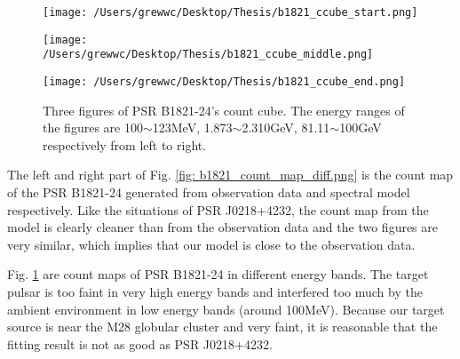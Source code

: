 \documentclass[12pt]{report}
\newcommand{\mycaption}[1]{\protect \caption{#1}}
\begin{document}
              \begin{figure}[!ht]
                \begin{center}
                \begin{minipage}{0.32\textwidth}
                  \begin{center} 
                    \texttt{[image: /Users/grewwc/Desktop/Thesis/b1821\_ccube\_start.png]}
                  \end{center}
                \end{minipage}
                \begin{minipage}{0.32\textwidth}
                  \begin{center}
                    \texttt{[image: /Users/grewwc/Desktop/Thesis/b1821\_ccube\_middle.png]}
                  \end{center}
                \end{minipage}
                \begin{minipage}{0.32\textwidth}
                  \begin{center}
                  \texttt{[image: /Users/grewwc/Desktop/Thesis/b1821\_ccube\_end.png]}
                  \end{center}
                \end{minipage}
              \end{center}
              \mycaption{Three figures of PSR B1821-24's count cube. The energy ranges of the figures are  
                100$\sim$123MeV, 1.873$\sim$2.310GeV, 81.11$\sim$100GeV respectively from left to right.}
              \label{fig: b1821_ccube_1_15_33.png}
              \end{figure}

              The left and right part of Fig. \ref{fig: b1821_count_map_diff.png} is the count 
              map of the PSR B1821-24 generated from observation data and spectral model respectively. 
              Like the situations of PSR J0218+4232, the count map from the model is clearly cleaner than 
              from the observation data and the two figures are very similar, which implies that our model 
              is close to the observation data. 

              Fig. \ref{fig: b1821_ccube_1_15_33.png} are count maps of PSR B1821-24 in different energy 
              bands. The target pulsar is too faint in very high energy bands and interfered too much by the ambient 
              environment in low energy bands (around 100MeV). Because our target source is near the M28 globular 
              cluster and very faint, it is reasonable that the fitting result is not as good as PSR J0218+4232. 
\end{document}
